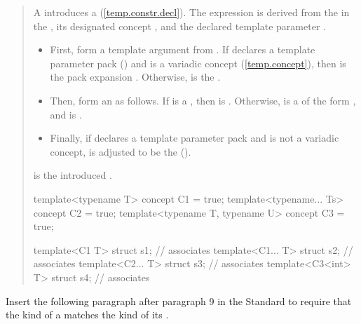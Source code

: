 \begin{quote}
\begin{addedblock}
\pnum
A  introduces a 
 (\ref{temp.constr.decl}).
% 
The expression is derived from the  
 in the , its designated concept 
, and the declared template parameter .
% 
\begin{itemize}
\item First, form a template argument  from . If  
declares a template parameter pack ()
and  is a variadic concept (\ref{temp.concept}), then  is 
the pack expansion . Otherwise,  is the 
 .

\item Then, form an   as follows.
If  is a , then  is . 
Otherwise,  is a  of the form 
, and  is .

\item Finally, if  declares a template parameter pack and 
 is not a variadic concept,  is adjusted to be the
  ().
\end{itemize}
% 
 is the introduced .
% 
\enterexample
\begin{codeblock}
template<typename T> concept C1 = true;
template<typename... Ts> concept C2 = true;
template<typename T, typename U> concept C3 = true;

template<C1 T> struct s1;      // associates 
template<C1... T> struct s2;   // associates 
template<C2... T> struct s3;   // associates 
template<C3<int> T> struct s4; // associates 
\end{codeblock}
\exitexample
\end{addedblock}
\end{quote}

Insert the following paragraph after paragraph 9 in the \Cpp Standard to 
require that the kind of a  matches the kind 
of its .

